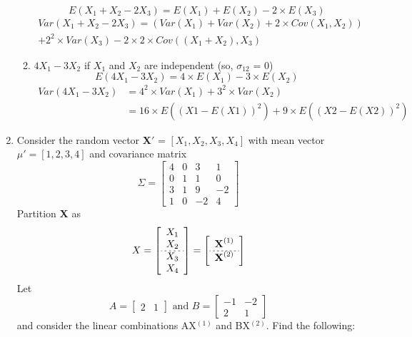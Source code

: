 \documentclass[12pt,a4paper]{paper}
\begin{document}
\begin{enumerate}
\begin{enumerate}
\begin{equation}
E(X_{1} +X_{2}-2X_{3}) = E(X_{1}) + E(X_{2}) - 2 \times E(X_{3})
\end{equation}
\begin{equation}
\begin{split}
Var(X_{1} +X_{2}-2X_{3}) = (Var(X_{1}) + Var(X_{2}) + 2 \times Cov(X_{1},X_{2}))\\ + 2^2 \times Var(X_{3}) - 2 \times 2 \times Cov((X_{1}+X_{2}),X_{3})
\end{split}
\end{equation}
\item $4X_{1} - 3X_{2}$ if $X_{1}$ and $X_{2}$ are independent (so, $\sigma_{12}$ = 0)
\begin{equation}
E(4X_{1} - 3X_{2}) = 4 \times E(X_{1}) - 3 \times E(X_{2})
\end{equation}
\begin{equation}
\begin{split}
Var(4X_{1} - 3X_{2}) &= 4^2 \times Var(X_{1}) + 3^2 \times Var(X_{2})\\
&= 16 \times E((X1-E(X1))^2) + 9 \times E((X2-E(X2))^2)
\end{split}
\end{equation}
\end{enumerate}
\item Consider the random vector \textbf{X$'$} = $\left[X_{1},X_{2},X_{3},X_{4}\right]$ with mean vector $\mu'= \left[1,2,3,4\right]$ and covariance matrix \[\Sigma=\left[\begin{array}{cccc}
4 & 0 & 3 & 1 \\ 0 & 1 & 1 & 0 \\ 3 & 1 & 9 & -2 \\ 1 & 0 & -2 & 4
\end{array}\right]\] Partition \textbf{X} as \[X=\left[\begin{array}{c}X_{1}\\X_{2}\\\hdashline[2pt/2pt]X_{3}\\X_{4}\end{array}\right] = \left[\begin{array}{c}\textbf{X}^{(1)}\\\hdashline[2pt/2pt]\textbf{X}^{(2)}\end{array}\right]\] Let \[A = \left[\begin{array}{cc}2 & 1\end{array}\right] \text{ and } B = \left[\begin{array}{cc}-1 & -2 \\ 2 & 1\end{array}\right]\] and consider the linear combinations AX$^{(1)}$ and BX$^{(2)}$. Find the following:

\end{enumerate}
\end{document}
